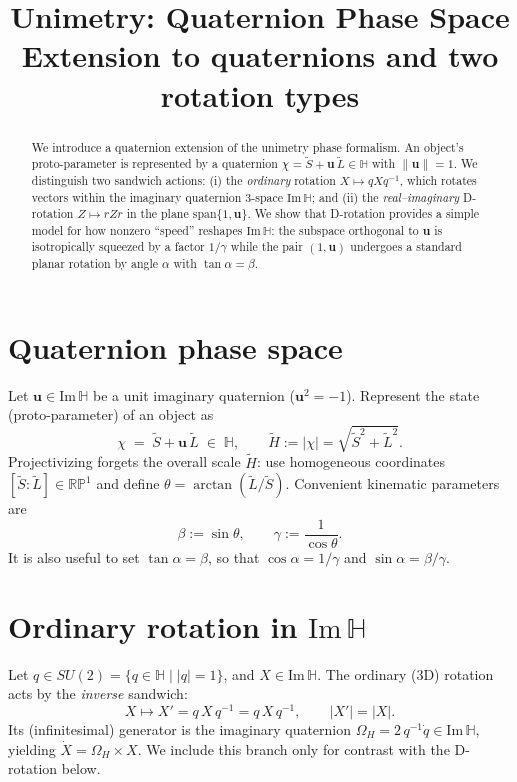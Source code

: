 \documentclass[11pt,a4paper]{article}
\title{\textbf{Unimetry: Quaternion Phase Space}\\
{\large Extension to quaternions and two rotation types}}
\author{}
\date{}
\newcommand{\HH}{\mathbb{H}}
\newcommand{\ImH}{\mathrm{Im}\,\mathbb{H}}
\newcommand{\uu}{\mathbf{u}}        %
\newcommand{\Snd}[2]{#1\,#2\,#1^{-1}} %
\begin{document}
\maketitle

\begin{abstract}
We introduce a quaternion extension of the unimetry phase formalism. An object's proto-parameter is represented by a quaternion
\(\chi=\tilde S+\uu\,\tilde L\in\HH\) with \(\|\uu\|=1\). We distinguish two sandwich actions: (i) the \emph{ordinary} rotation \(X\mapsto qXq^{-1}\), which rotates vectors within the imaginary quaternion 3-space \(\ImH\); and (ii) the \emph{real--imaginary} D-rotation \(Z\mapsto rZr\) in the plane \(\mathrm{span}\{1,\uu\}\). We show that D-rotation provides a simple model for how nonzero ``speed'' reshapes \(\ImH\): the subspace orthogonal to \(\uu\) is isotropically squeezed by a factor \(1/\gamma\) while the pair \((1,\uu)\) undergoes a standard planar rotation by angle \(\alpha\) with \(\tan\alpha=\beta\).
\end{abstract}

\section{Quaternion phase space}
Let \(\uu\in\ImH\) be a unit imaginary quaternion (\(\uu^2=-1\)). Represent the state (proto-parameter) of an object as
\begin{equation}
  \chi \;=\; \tilde S + \uu\,\tilde L \;\in\; \HH,\qquad
  \tilde H := |\chi| = \sqrt{\tilde S^2+\tilde L^2}.
\end{equation}
Projectivizing forgets the overall scale \(\tilde H\): use homogeneous coordinates \([\tilde S:\tilde L]\in\mathbb{RP}^1\) and define
\(\theta=\arctan(\tilde L/\tilde S)\). Convenient kinematic parameters are
\begin{equation}
  \beta := \sin\theta,\qquad
  \gamma := \frac{1}{\cos\theta}.
\end{equation}
It is also useful to set \(\tan\alpha=\beta\), so that \(\cos\alpha=1/\gamma\) and \(\sin\alpha=\beta/\gamma\).

\section{Ordinary rotation in \texorpdfstring{\(\ImH\)}{Im H}}
Let \(q\in SU(2)=\{q\in\HH\mid |q|=1\}\), and \(X\in\ImH\).
The ordinary (3D) rotation acts by the \emph{inverse} sandwich:
\begin{equation}
  X \mapsto X' = \Snd{q}{X} = q\,X\,q^{-1},\qquad |X'|=|X|.
\end{equation}
Its (infinitesimal) generator is the imaginary quaternion \(\Omega_H=2\,q^{-1}\dot q\in\ImH\), yielding \(\dot X = \Omega_H\times X\).
We include this branch only for contrast with the D-rotation below.
\end{document}
